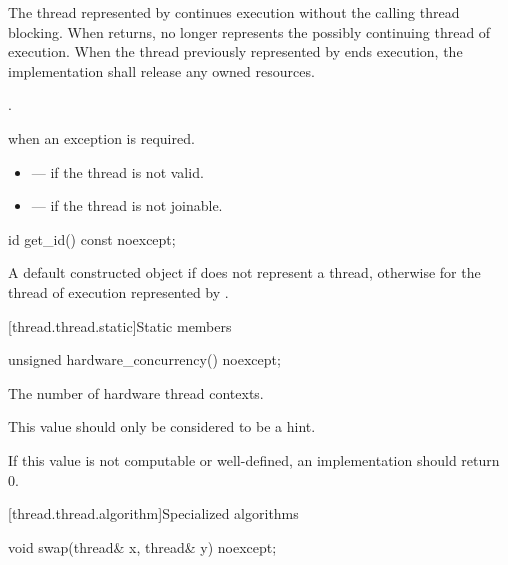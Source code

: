 \begin{itemdescr}
\pnum
\effects
The thread represented by  continues execution without the calling thread
blocking. When  returns,  no longer represents the possibly continuing
thread of execution. When the thread previously represented by  ends execution, the
implementation shall release any owned resources.

\pnum
\ensures
{}.

\pnum
\throws
{} when
an exception is required.

\pnum
\errors
\begin{itemize}
\item {} --- if the thread is not valid.
\item {} --- if the thread is not joinable.
\end{itemize}
\end{itemdescr}

%
\begin{itemdecl}
id get_id() const noexcept;
\end{itemdecl}

\begin{itemdescr}
\pnum
\returns
A default constructed  object if  does not represent a thread,
otherwise  for the thread of execution represented by
.
\end{itemdescr}

[thread.thread.static]{Static members}

%
\begin{itemdecl}
unsigned hardware_concurrency() noexcept;
\end{itemdecl}

\begin{itemdescr}
\pnum
\returns
The number of hardware thread contexts.
\begin{note}
This value should
only be considered to be a hint.
\end{note}
If this value is not computable or
well-defined, an implementation should return 0.
\end{itemdescr}

[thread.thread.algorithm]{Specialized algorithms}

%
\begin{itemdecl}
void swap(thread& x, thread& y) noexcept;
\end{itemdecl}

